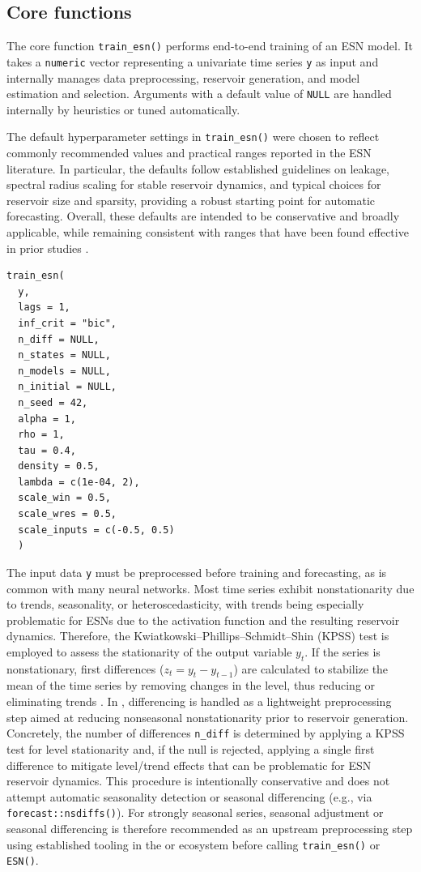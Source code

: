 \subsection{Core functions}\label{core-functions}

The core function \texttt{train\_esn()} performs end-to-end training of an ESN model. It takes a \texttt{numeric} vector representing a univariate time series \texttt{y} as input and internally manages data preprocessing, reservoir generation, and model estimation and selection. Arguments with a default value of \texttt{NULL} are handled internally by heuristics or tuned automatically.

The default hyperparameter settings in \texttt{train\_esn()} were chosen to reflect commonly recommended values and practical ranges reported in the ESN literature. In particular, the defaults follow established guidelines on leakage, spectral radius scaling for stable reservoir dynamics, and typical choices for reservoir size and sparsity, providing a robust starting point for automatic forecasting. Overall, these defaults are intended to be conservative and broadly applicable, while remaining consistent with ranges that have been found effective in prior studies \citep{Viehweg2023, Lukosevicius2012}.

\begin{verbatim}
train_esn(
  y,
  lags = 1,
  inf_crit = "bic",
  n_diff = NULL,
  n_states = NULL,
  n_models = NULL,
  n_initial = NULL,
  n_seed = 42,
  alpha = 1,
  rho = 1,
  tau = 0.4,
  density = 0.5,
  lambda = c(1e-04, 2),
  scale_win = 0.5,
  scale_wres = 0.5,
  scale_inputs = c(-0.5, 0.5)
  )
\end{verbatim}

The input data \texttt{y} must be preprocessed before training and forecasting, as is common with many neural networks. Most time series exhibit nonstationarity due to trends, seasonality, or heteroscedasticity, with trends being especially problematic for ESNs due to the activation function and the resulting reservoir dynamics. Therefore, the Kwiatkowski--Phillips--Schmidt--Shin (KPSS) test \citep{Kwiatkowski1992} is employed to assess the stationarity of the output variable \(y_t\). If the series is nonstationary, first differences (\(z_t = y_t - y_{t-1}\)) are calculated to stabilize the mean of the time series by removing changes in the level, thus reducing or eliminating trends \citep{Hyndman2021}. In , differencing is handled as a lightweight preprocessing step aimed at reducing nonseasonal nonstationarity prior to reservoir generation. Concretely, the number of differences \texttt{n\_diff} is determined by applying a KPSS test for level stationarity and, if the null is rejected, applying a single first difference to mitigate level/trend effects that can be problematic for ESN reservoir dynamics. This procedure is intentionally conservative and does not attempt automatic seasonality detection or seasonal differencing (e.g., via \texttt{forecast::nsdiffs()}). For strongly seasonal series, seasonal adjustment or seasonal differencing is therefore recommended as an upstream preprocessing step using established tooling in the  or  ecosystem before calling \texttt{train\_esn()} or \texttt{ESN()}.

